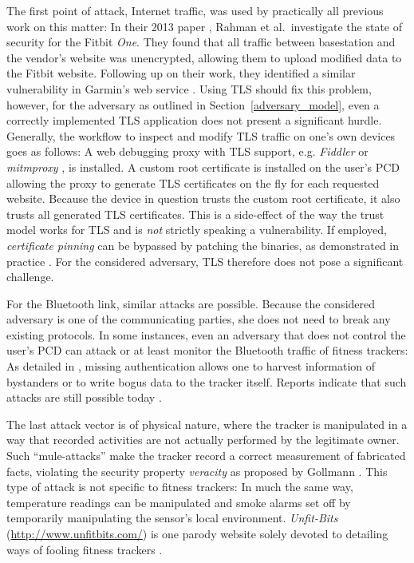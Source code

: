 \documentclass[english]{lni}
\begin{document}
The first point of attack, Internet traffic, was used by practically all previous work on this matter: In their 2013 paper \cite{Rahman13}, Rahman et al.\ investigate the state of security for the Fitbit \emph{One}. They found that all traffic between basestation and the vendor's website was unencrypted, allowing them to upload modified data to the Fitbit website. Following up on their work, they identified a similar vulnerability in Garmin's web service \cite{Rahman14}. Using TLS should fix this problem, however, for the adversary as outlined in Section~\ref{adversary_model}, even a correctly implemented TLS application does not present a significant hurdle. Generally, the workflow to inspect and modify TLS traffic on one's own devices goes as follows: A web debugging proxy with TLS support, e.g. \emph{Fiddler} \cite{Fiddler} or \emph{mitmproxy} \cite{mitmproxy}, is installed. A custom root certificate is installed on the user's PCD allowing the proxy to generate TLS certificates on the fly for each requested website. Because the device in question trusts the custom root certificate, it also trusts all generated TLS certificates. This is a side-effect of the way the trust model works for TLS and is \emph{not} strictly speaking a vulnerability. If employed, \emph{certificate pinning} can be bypassed by patching the binaries, as demonstrated in practice \cite{Kramer15, Rizzo12}. For the considered adversary, TLS therefore does not pose a significant challenge.

For the Bluetooth link, similar attacks are possible. Because the considered adversary is one of the communicating parties, she does not need to break any existing protocols. In some instances, even an adversary that does not control the user's PCD can attack or at least monitor the Bluetooth traffic of fitness trackers: As detailed in \cite{Rahman14}, missing authentication allows one to harvest information of bystanders or to write bogus data to the tracker itself. Reports indicate that such attacks are still possible today \cite{Symantic}.

The last attack vector is of physical nature, where the tracker is manipulated in a way that recorded activities are not actually performed by the legitimate owner. Such ``mule-attacks'' \cite{Rahman13} make the tracker record a correct measurement of fabricated facts, violating the security property \emph{veracity} as proposed by Gollmann \cite{gollmann2012veracity}. This type of attack is not specific to fitness trackers: In much the same way, temperature readings can be manipulated and smoke alarms set off by temporarily manipulating the sensor's local environment. \emph{Unfit-Bits} (\url{http://www.unfitbits.com/}) is one parody website solely devoted to detailing ways of fooling fitness trackers \cite{Unfitbits}.
\end{document}
